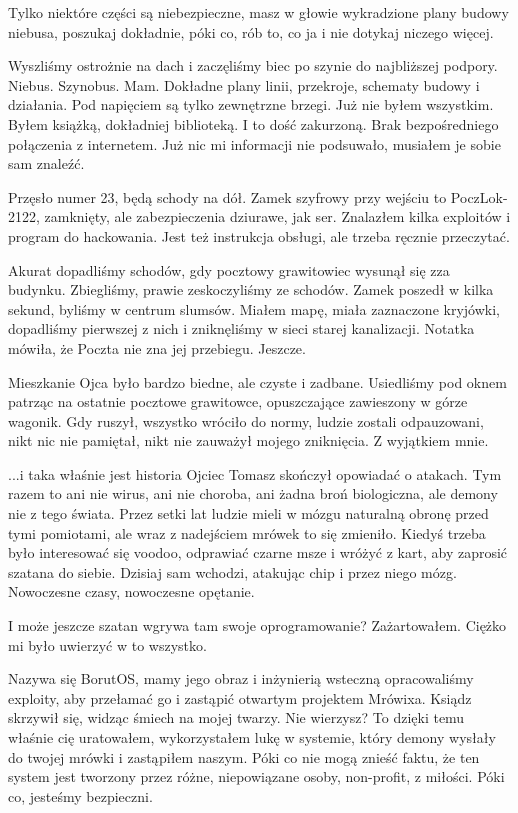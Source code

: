 \ds{} Tylko niektóre części są niebezpieczne, masz w głowie wykradzione plany budowy niebusa, poszukaj dokładnie, póki co, rób to, co ja i nie dotykaj niczego więcej. \de{}

Wyszliśmy ostrożnie na dach i zaczęliśmy biec po szynie do najbliższej podpory.
Niebus. Szynobus. Mam. Dokładne plany linii, przekroje, schematy budowy i działania.
Pod napięciem są tylko zewnętrzne brzegi.
Już nie byłem wszystkim. Byłem książką, dokładniej biblioteką. I to dość zakurzoną.
Brak bezpośredniego połączenia z internetem. Już nic mi informacji nie podsuwało, musiałem je sobie sam znaleźć.

Przęsło numer 23, będą schody na dół. Zamek szyfrowy przy wejściu to PoczLok-2122, zamknięty, ale zabezpieczenia dziurawe, jak ser. 
Znalazłem kilka exploitów i program do hackowania. Jest też instrukcja obsługi, ale trzeba ręcznie przeczytać.

Akurat dopadliśmy schodów, gdy pocztowy grawitowiec wysunął się zza budynku. 
Zbiegliśmy, prawie zeskoczyliśmy ze schodów. Zamek poszedł w kilka sekund, byliśmy w centrum slumsów.
Miałem mapę, miała zaznaczone kryjówki, dopadliśmy pierwszej z nich i zniknęliśmy w sieci starej kanalizacji.
Notatka mówiła, że Poczta nie zna jej przebiegu. Jeszcze.

\divider{}
Mieszkanie Ojca było bardzo biedne, ale czyste i zadbane.
Usiedliśmy pod oknem patrząc na ostatnie pocztowe grawitowce, opuszczające zawieszony w górze wagonik.
Gdy ruszył, wszystko wróciło do normy, ludzie zostali odpauzowani, nikt nic nie pamiętał, nikt nie zauważył mojego zniknięcia.
Z wyjątkiem mnie.

\ds{} ...i taka właśnie jest historia \dm{} Ojciec Tomasz skończył opowiadać o atakach. \dm{}
Tym razem to ani nie wirus, ani nie choroba, ani żadna broń biologiczna, ale demony nie z tego świata.
Przez setki lat ludzie mieli w mózgu naturalną obronę przed tymi pomiotami, ale wraz z nadejściem mrówek to się zmieniło.
Kiedyś trzeba było interesować się voodoo, odprawiać czarne msze i wróżyć z kart, aby zaprosić szatana do siebie.
Dzisiaj sam wchodzi, atakując chip i przez niego mózg. Nowoczesne czasy, nowoczesne opętanie.\de{}

\ds{} I może jeszcze szatan wgrywa tam swoje oprogramowanie? \dm{} Zażartowałem. Ciężko mi było uwierzyć w to wszystko. \de{}

\ds{} Nazywa się BorutOS, mamy jego obraz i inżynierią wsteczną opracowaliśmy exploity, aby przełamać go i zastąpić otwartym projektem Mrówixa. \dm{}
Ksiądz skrzywił się, widząc śmiech na mojej twarzy. \dm{} Nie wierzysz? To dzięki temu właśnie cię uratowałem, wykorzystałem lukę w systemie, który
demony wysłały do twojej mrówki i zastąpiłem naszym. Póki co nie mogą znieść faktu, że ten system jest tworzony przez różne, niepowiązane osoby, non-profit, z miłości.
Póki co, jesteśmy bezpieczni. \de{}

